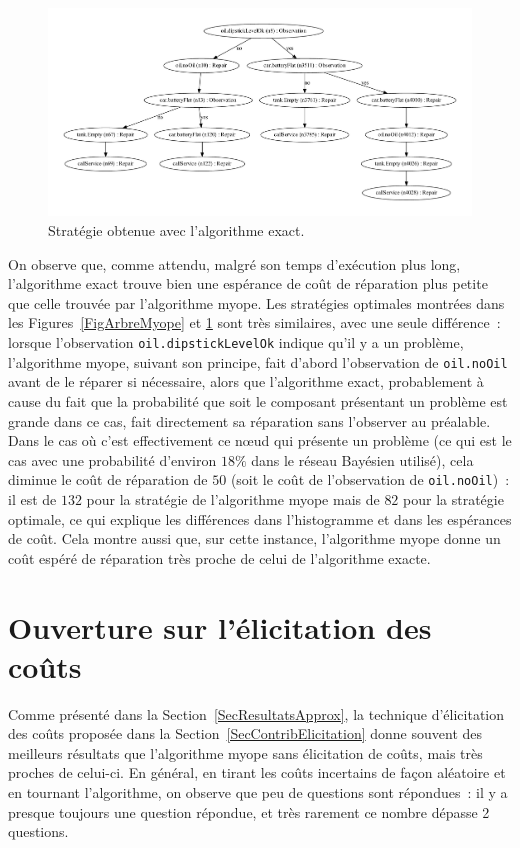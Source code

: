 \documentclass[a4paper,11pt]{article}
\theoremstyle{plain}
\theoremstyle{definition}
\begin{document}
\begin{figure}[ht]
\centering
\includegraphics[width=\textwidth]{Figures/exact.pdf}
\caption{Stratégie obtenue avec l'algorithme exact.}
\label{FigArbreExact}
\end{figure}

On observe que, comme attendu, malgré son temps d'exécution plus long, l'algorithme exact trouve bien une espérance de coût de réparation plus petite que celle trouvée par l'algorithme myope. Les stratégies optimales montrées dans les Figures~\ref{FigArbreMyope} et \ref{FigArbreExact} sont très similaires, avec une seule différence~: lorsque l'observation \texttt{oil.dipstickLevelOk} indique qu'il y a un problème, l'algorithme myope, suivant son principe, fait d'abord l'observation de \texttt{oil.noOil} avant de le réparer si nécessaire, alors que l'algorithme exact, probablement à cause du fait que la probabilité que  soit le composant présentant un problème est grande dans ce cas, fait directement sa réparation sans l'observer au préalable. Dans le cas où c'est effectivement ce nœud qui présente un problème (ce qui est le cas avec une probabilité d'environ $18\%$ dans le réseau Bayésien utilisé), cela diminue le coût de réparation de $50$ (soit le coût de l'observation de \texttt{oil.noOil})~: il est de $132$ pour la stratégie de l'algorithme myope mais de $82$ pour la stratégie optimale, ce qui explique les différences dans l'histogramme et dans les espérances de coût. Cela montre aussi que, sur cette instance, l'algorithme myope donne un coût espéré de réparation très proche de celui de l'algorithme exacte.

\section{Ouverture sur l'élicitation des coûts}

Comme présenté dans la Section~\ref{SecResultatsApprox}, la technique d'élicitation des coûts proposée dans la Section~\ref{SecContribElicitation} donne souvent des meilleurs résultats que l'algorithme myope sans élicitation de coûts, mais très proches de celui-ci. En général, en tirant les coûts incertains de façon aléatoire et en tournant l'algorithme, on observe que peu de questions sont répondues~: il y a presque toujours une question répondue, et très rarement ce nombre dépasse 2 questions.
\end{document}
